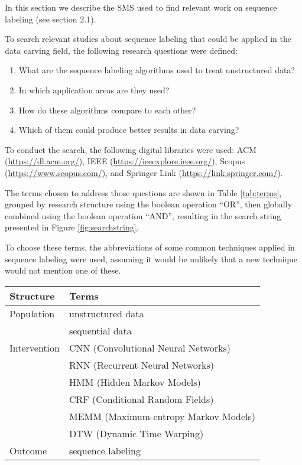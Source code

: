 In this section we describe the SMS used to find relevant work on sequence labeling (see section 2.1).

To search relevant studies about sequence labeling that could be applied in the data carving field, the following research questions were defined:

\begin{enumerate}[itemindent=\parindent,label=\textbf{RQ\arabic*.}]
\item   What are the sequence labeling algorithms used to treat unstructured data?
\item   In which application areas are they used?
\item   How do these algorithms compare to each other?
\item   Which of them could produce better results in data carving?
\end{enumerate}

To conduct the search, the following digital libraries were used: ACM (\url{https://dl.acm.org/}), 
IEEE (\url{https://ieeexplore.ieee.org/}),
Scopus (\url{https://www.scopus.com/}),
and
Springer Link (\url{https://link.springer.com/}).

The terms chosen to address those questions are shown in Table \ref{tab:terms}, grouped by research structure using the boolean operation “OR”, then globally combined using the boolean operation “AND”, resulting in the search string presented in  Figure \ref{fig:searchstring}.

To choose these terms, the abbreviations of some common techniques applied in sequence labeling were used, assuming it would be unlikely that a new technique would not mention one of these. 


\begin{table*}[!ht]
    \centering
    \caption{Terms used}
    \label{tab:terms}
    \begin{tabular}{ l  l  }
      Structure 	& Terms 		 \\
      \hline\hline
      Population 	& unstructured data \\   
                    & sequential data \\
      \hline
      Intervention 	& CNN (Convolutional Neural Networks)\\
                    & RNN (Recurrent Neural Networks)\\
                    & HMM (Hidden Markov Models)\\
                    & CRF (Conditional Random Fields)\\
                    & MEMM (Maximum-entropy Markov Models)\\
                    & DTW (Dynamic Time Warping)\\
      \hline
      Outcome 		& sequence labeling \\
      \hline
    \end{tabular}
\end{table*}

